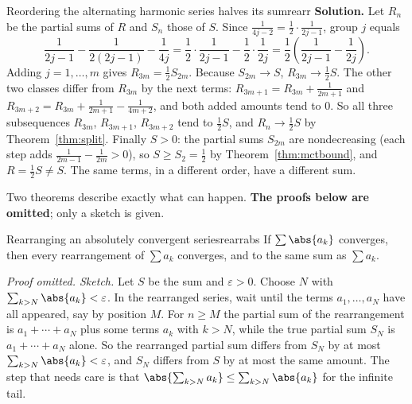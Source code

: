 \documentclass[11pt]{article}
\begin{document}
\begin{exmp}{Reordering the alternating harmonic series halves its sum}{rearr}
\textbf{Solution.} Let $R_n$ be the partial sums of $R$ and $S_n$ those of $S$. Since $\frac1{4j-2}=\frac12\cdot\frac1{2j-1}$, group $j$ equals
\[
\frac1{2j-1}-\frac1{2(2j-1)}-\frac1{4j}=\frac12\cdot\frac1{2j-1}-\frac12\cdot\frac1{2j}=\frac12\left(\frac1{2j-1}-\frac1{2j}\right).
\]
Adding $j=1,\dots,m$ gives $R_{3m}=\frac12S_{2m}$. Because $S_{2m}\to S$, $R_{3m}\to\frac12S$. The other two classes differ from $R_{3m}$ by the next terms: $R_{3m+1}=R_{3m}+\frac1{2m+1}$ and $R_{3m+2}=R_{3m}+\frac1{2m+1}-\frac1{4m+2}$, and both added amounts tend to $0$. So all three subsequences $R_{3m}$, $R_{3m+1}$, $R_{3m+2}$ tend to $\frac12S$, and $R_n\to\frac12S$ by Theorem~\ref{thm:split}. Finally $S>0$: the partial sums $S_{2m}$ are nondecreasing (each step adds $\frac1{2m-1}-\frac1{2m}>0$), so $S\ge S_2=\frac12$ by Theorem~\ref{thm:mctbound}, and $R=\frac12S\ne S$.
The same terms, in a different order, have a different sum.
\end{exmp}

Two theorems describe exactly what can happen. \textbf{The proofs below are omitted}; only a sketch is given.

\begin{thm}{Rearranging an absolutely convergent series}{rearrabs}
If $\sum\abs{a_k}$ converges, then every rearrangement of $\sum a_k$ converges, and to the same sum as $\sum a_k$.
\end{thm}
\emph{Proof omitted. Sketch.} Let $S$ be the sum and $\varepsilon>0$. Choose $N$ with $\sum_{k>N}\abs{a_k}<\varepsilon$. In the rearranged series, wait until the terms $a_1,\dots,a_N$ have all appeared, say by position $M$. For $n\ge M$ the partial sum of the rearrangement is $a_1+\cdots+a_N$ plus some terms $a_k$ with $k>N$, while the true partial sum $S_N$ is $a_1+\cdots+a_N$ alone. So the rearranged partial sum differs from $S_N$ by at most $\sum_{k>N}\abs{a_k}<\varepsilon$, and $S_N$ differs from $S$ by at most the same amount. The step that needs care is that $\abs{\sum_{k>N}a_k}\le\sum_{k>N}\abs{a_k}$ for the infinite tail.
\end{document}
